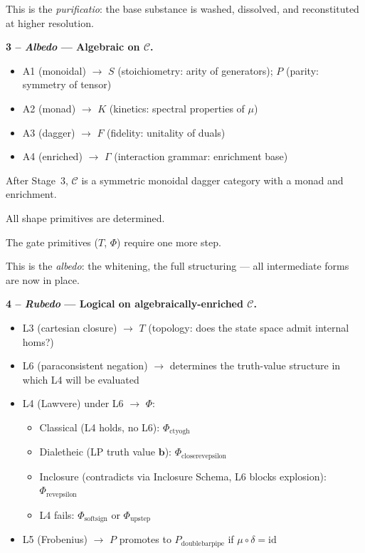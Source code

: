 \documentclass[twocolumn]{article}
\begin{document}
This is the \emph{purificatio}: the base substance is washed, dissolved, and reconstituted at higher resolution.

\smallskip
\noindent\textbf{3 -- \emph{Albedo} --- Algebraic on $\mathcal{C}$.}
\begin{itemize}[nosep, leftmargin=1.5em]
  \item A1 (monoidal) $\to$ $S$ (stoichiometry: arity of generators); $P$ (parity: symmetry of tensor)
  \item A2 (monad) $\to$ $K$ (kinetics: spectral properties of $\mu$)
  \item A3 (dagger) $\to$ $F$ (fidelity: unitality of duals)
  \item A4 (enriched) $\to$ $\Gamma$ (interaction grammar: enrichment base)
\end{itemize}
After Stage~3, $\mathcal{C}$ is a symmetric monoidal dagger category with a monad and enrichment.  

All shape primitives are determined.  

The gate primitives ($T$, $\Phi$) require one more step.  

This is the \emph{albedo}: the whitening, the full structuring --- all intermediate forms are now in place.

\smallskip
\noindent\textbf{4 -- \emph{Rubedo} --- Logical on algebraically-enriched $\mathcal{C}$.}
\begin{itemize}[nosep, leftmargin=1.5em]
  \item L3 (cartesian closure) $\to$ $T$ (topology: does the state space admit internal homs?)  

  \item L6 (paraconsistent negation) $\to$ determines the truth-value structure in which L4 will be evaluated  

  \item L4 (Lawvere) under L6 $\to$ $\Phi$:
  \begin{itemize}[nosep, leftmargin=1em]
    \item[\small$\circ$] Classical (L4 holds, no L6): $\Phi_{\text{ctyogh}}$
    \item[\small$\circ$] Dialetheic (LP truth value $\mathbf{b}$): $\Phi_{\text{closerevepsilon}}$
    \item[\small$\circ$] Inclosure (contradicts via Inclosure Schema, L6 blocks explosion): $\Phi_{\text{revepsilon}}$
    \item[\small$\circ$] L4 fails: $\Phi_{\text{softsign}}$ or $\Phi_{\text{upstep}}$
  \end{itemize}

  \item L5 (Frobenius) $\to$ $P$ promotes to $P_{\text{doublebarpipe}}$ if $\mu \circ \delta = \text{id}$
\end{itemize}  
\end{document}

